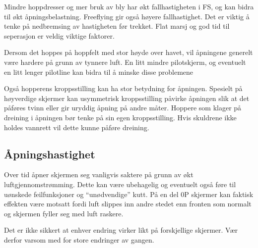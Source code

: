 Mindre hoppdresser og mer bruk av bly har økt fallhastigheten i FS, og kan bidra til økt åpningsbelastning. Freeflying gir også høyere fallhastighet. Det er viktig å tenke på nedbremsing av hastigheten før trekket. Flat marsj og god tid til seperasjon er veldig viktige faktorer.

Dersom det hoppes på hoppfelt med stor høyde over havet, vil åpningene generelt være hardere på grunn av tynnere luft. En litt mindre pilotskjerm, og eventuelt en litt lenger pilotline kan bidra til å minske disse problemene

Også hopperens kroppsstilling kan ha stor betydning for åpningen. Spesielt på høyverdige skjermer kan usymmetrisk kroppsstilling påvirke åpningen slik at det påføres tvinn eller gir uryddig åpning på andre måter. Hoppere som klager på dreining i åpningen bør tenke på sin egen kroppsstilling. Hvis skuldrene ikke holdes vannrett vil dette kunne påføre dreining.

\subsection{Åpningshastighet}
Over tid åpner skjermen seg vanligvis saktere på grunn av økt luftgjennomstrømming. Dette kan være ubehagelig og eventuelt også føre til uønskede feilfunksjoner og ``unødvendige'' kutt. På en del 0P skjermer kan faktisk effekten være motsatt fordi luft slippes inn andre stedet enn fronten som normalt og skjermen fyller seg med luft raskere.

Det er ikke sikkert at enhver endring virker likt på forskjellige skjermer. Vær derfor varsom med for store endringer av gangen.

